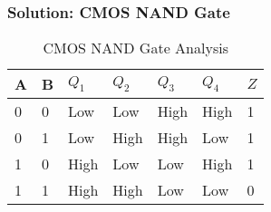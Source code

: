 \ifnum{}
\begin{frame}\frametitle{Solution: CMOS NAND Gate}

\begin{table}[H]
\begin{center}
    \begin{tabular}{ |p{1cm} |p{1cm} || p{1cm} |p{1cm} |p{1cm} |p{1cm} || p{1cm} |}
    \hline 
A & B & $Q_1$ & $Q_2$ & $Q_3$ & $Q_4$ & $Z$  \\ \hline
0 & 0 & Low  & Low  & High & High & 1  \\ \hline
0 & 1 & Low  & High & High & Low  & 1 \\ \hline
1 & 0 & High & Low  & Low  & High & 1\\ \hline
1 & 1 & High & High & Low  & Low  & 0  \\ \hline
\end{tabular}
\small\caption{CMOS NAND Gate Analysis}
\end{center}
\end{table}
\end{frame}
\fi 


    


